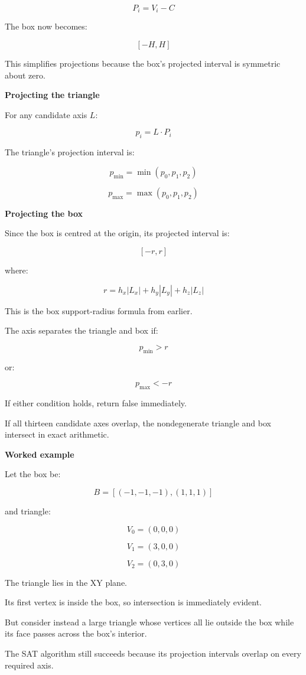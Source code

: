 \[
\boxed{ P_i=V_i-C }
\]

The box now becomes:

\[
[-H,H]
\]

This simplifies projections because the box's projected interval is symmetric about zero.

\textbf{Projecting the triangle}

For any candidate axis \(L\):

\[
p_i=L\cdot P_i
\]

The triangle's projection interval is:

\[
\boxed{ p_{\min}=\min(p_0,p_1,p_2) }
\]

\[
\boxed{ p_{\max}=\max(p_0,p_1,p_2) }
\]

\textbf{Projecting the box}

Since the box is centred at the origin, its projected interval is:

\[
[-r,r]
\]

where:

\[
\boxed{ r=h_x|L_x|+h_y|L_y|+h_z|L_z| }
\]

This is the box support-radius formula from earlier.

The axis separates the triangle and box if:

\[
\boxed{ p_{\min}>r }
\]

or:

\[
\boxed{ p_{\max}<-r }
\]

If either condition holds, return false immediately.

If all thirteen candidate axes overlap, the nondegenerate triangle and box intersect in exact arithmetic.

\textbf{Worked example}

Let the box be:

\[
B=[(-1,-1,-1),(1,1,1)]
\]

and triangle:

\[
V_0=(0,0,0)
\]

\[
V_1=(3,0,0)
\]

\[
V_2=(0,3,0)
\]

The triangle lies in the XY plane.

Its first vertex is inside the box, so intersection is immediately evident.

But consider instead a large triangle whose vertices all lie outside the box while its face passes across the box's interior.

The SAT algorithm still succeeds because its projection intervals overlap on every required axis.

